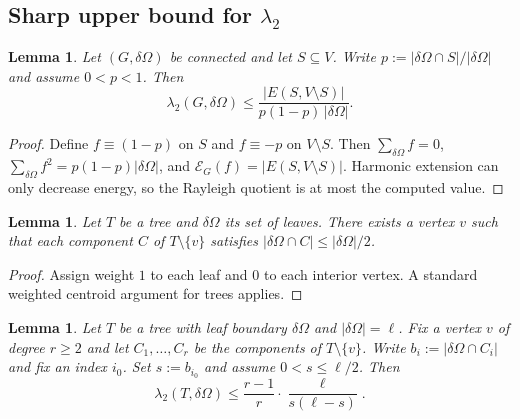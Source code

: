 \documentclass[11pt]{article}
\newtheorem{lemma}[theorem]{Lemma}
\theoremstyle{definition}
\theoremstyle{remark}
\newcommand{\dO}{\delta\Omega}
\begin{document}
\subsection{Sharp upper bound for \texorpdfstring{$\lambda_2$}{lambda\_2}}\label{subsec:sharp}

\begin{lemma}\label{lem:cut}
Let $(G,\dO)$ be connected and let $S\subseteq V$.
Write $p:=|\dO\cap S|/|\dO|$ and assume $0<p<1$.
Then
\begin{equation}\label{eq:cut}
\lambda_2(G,\dO)\le \frac{|E(S,V\setminus S)|}{p(1-p)\,|\dO|}.
\end{equation}
\end{lemma}

\begin{proof}
Define $f\equiv(1-p)$ on $S$ and $f\equiv -p$ on $V\setminus S$.
Then $\sum_{\dO}f=0$, $\sum_{\dO}f^2=p(1-p)|\dO|$, and $\mathcal{E}_G(f)=|E(S,V\setminus S)|$.
Harmonic extension can only decrease energy, so the Rayleigh quotient is at most the computed value.
\end{proof}

\begin{lemma}\label{lem:centroid}
Let $T$ be a tree and $\dO$ its set of leaves.
There exists a vertex $v$ such that each component $C$ of $T\setminus\{v\}$ satisfies $|\dO\cap C|\le |\dO|/2$.
\end{lemma}

\begin{proof}
Assign weight $1$ to each leaf and $0$ to each interior vertex.
A standard weighted centroid argument for trees applies.
\end{proof}

\begin{lemma}\label{lem:vertex2value}
Let $T$ be a tree with leaf boundary $\dO$ and $|\dO|=\ell$.
Fix a vertex $v$ of degree $r\ge 2$ and let $C_1,\dots,C_r$ be the components of $T\setminus\{v\}$.
Write $b_i:=|\dO\cap C_i|$ and fix an index $i_0$.
Set $s:=b_{i_0}$ and assume $0<s\le\ell/2$.
Then
\begin{equation}\label{eq:vertex2value}
\lambda_2(T,\dO)\le \frac{r-1}{r}\cdot\frac{\ell}{s(\ell-s)}.
\end{equation}
\end{lemma}
\end{document}
